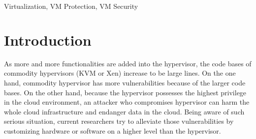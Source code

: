 \documentclass[conference]{IEEEtran}
\begin{document}
\begin{IEEEkeywords}
Virtualization, VM Protection, VM Security
\end{IEEEkeywords}

\section{Introduction}

As more and more functionalities are added into the hypervisor, the code bases of commodity hypervisors (KVM or Xen) increase to be large lines. On the one hand, commodity hypervisor has more vulnerabilities because of the larger code bases. On the other hand, because the hypervisor possesses the highest privilege in the cloud environment, an attacker who compromises hypervisor can harm the whole cloud infrastructure and endanger data in the cloud.
Being aware of such serious situation, current researchers try to alleviate those vulnerabilities by customizing hardware or software on a higher level than the hypervisor.
\end{document}
